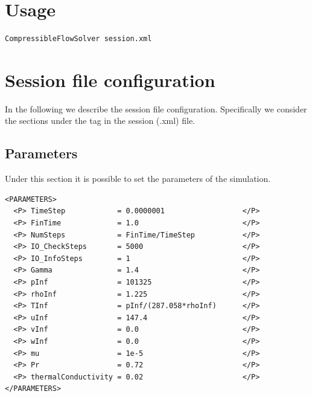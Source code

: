 \section{Usage}
\begin{lstlisting}[style=BashInputStyle]
CompressibleFlowSolver session.xml
\end{lstlisting}


\section{Session file configuration}
In the following we describe the session file configuration. Specifically we consider the
sections under the tag  in the session (.xml) file.
\subsection*{Parameters}
Under this section it is possible to set the parameters of the simulation.
\begin{lstlisting}[style=XmlStyle]
<PARAMETERS>
  <P> TimeStep            = 0.0000001                  </P>
  <P> FinTime             = 1.0                        </P>
  <P> NumSteps            = FinTime/TimeStep           </P>
  <P> IO_CheckSteps       = 5000                       </P>
  <P> IO_InfoSteps        = 1                          </P>
  <P> Gamma               = 1.4                        </P>
  <P> pInf                = 101325                     </P>
  <P> rhoInf              = 1.225                      </P>
  <P> TInf                = pInf/(287.058*rhoInf)      </P>
  <P> uInf                = 147.4                      </P>
  <P> vInf                = 0.0                        </P>
  <P> wInf                = 0.0                        </P>
  <P> mu                  = 1e-5                       </P>
  <P> Pr                  = 0.72                       </P>
  <P> thermalConductivity = 0.02                       </P>
</PARAMETERS>
\end{lstlisting}
